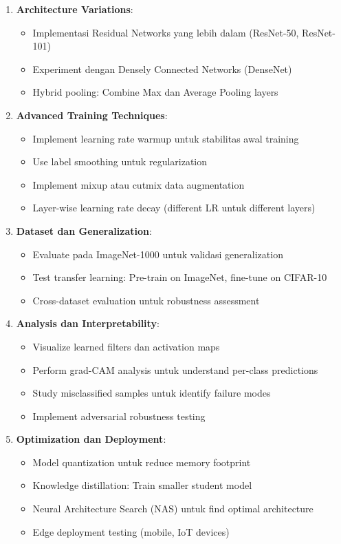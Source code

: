 \documentclass[12pt,a4paper]{report}
\begin{document}
\begin{enumerate}
    \item \textbf{Architecture Variations}:
    \begin{itemize}
        \item Implementasi Residual Networks yang lebih dalam (ResNet-50, ResNet-101)
        \item Experiment dengan Densely Connected Networks (DenseNet)
        \item Hybrid pooling: Combine Max dan Average Pooling layers
    \end{itemize}
    
    \item \textbf{Advanced Training Techniques}:
    \begin{itemize}
        \item Implement learning rate warmup untuk stabilitas awal training
        \item Use label smoothing untuk regularization
        \item Implement mixup atau cutmix data augmentation
        \item Layer-wise learning rate decay (different LR untuk different layers)
    \end{itemize}
    
    \item \textbf{Dataset dan Generalization}:
    \begin{itemize}
        \item Evaluate pada ImageNet-1000 untuk validasi generalization
        \item Test transfer learning: Pre-train on ImageNet, fine-tune on CIFAR-10
        \item Cross-dataset evaluation untuk robustness assessment
    \end{itemize}
    
    \item \textbf{Analysis dan Interpretability}:
    \begin{itemize}
        \item Visualize learned filters dan activation maps
        \item Perform grad-CAM analysis untuk understand per-class predictions
        \item Study misclassified samples untuk identify failure modes
        \item Implement adversarial robustness testing
    \end{itemize}
    
    \item \textbf{Optimization dan Deployment}:
    \begin{itemize}
        \item Model quantization untuk reduce memory footprint
        \item Knowledge distillation: Train smaller student model
        \item Neural Architecture Search (NAS) untuk find optimal architecture
        \item Edge deployment testing (mobile, IoT devices)
    \end{itemize}
\end{enumerate}
\end{document}
